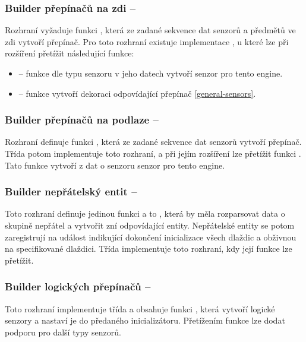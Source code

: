 \subsubsection{Builder přepínačů na zdi -- }
Rozhraní  vyžaduje funkci , která ze zadané sekvence dat senzorů a předmětů 
ve zdi vytvoří přepínač. Pro toto rozhraní existuje implementace , u které lze při rozšíření
přetížit následující funkce:
\begin{itemize}
\item {} -- funkce dle typu senzoru v jeho datech vytvoří senzor pro tento engine.
\item {} -- funkce vytvoří dekoraci odpovídající přepínač \vref{general-sensors}.
\end{itemize}


\subsubsection{Builder přepínačů na podlaze -- }
Rozhraní  definuje funkci , která ze zadané sekvence dat senzorů vytvoří přepínač. Třída 
potom implementuje toto rozhraní, a při jejím rozšíření lze přetížit funkci . Tato funkce vytvoří z dat o senzoru
senzor pro tento engine.

\subsubsection{Builder nepřátelský entit -- }
Toto rozhraní definuje jedinou funkci a to , která by měla rozparsovat data o skupině nepřátel a vytvořit zní odpovídající entity.
Nepřátelské entity se potom zaregistrují na událost indikující dokončení inicializace všech dlaždic a obživnou na specifikované dlaždici.
Třída  implementuje toto rozhraní, kdy její funkce  lze přetížit.


\subsubsection{Builder logických přepínačů -- }
Toto rozhraní implementuje třída  a obsahuje funkci , která vytvoří logické senzory
a nastaví je do předaného inicializátoru. Přetížením funkce  lze dodat podporu
pro další typy senzorů.


